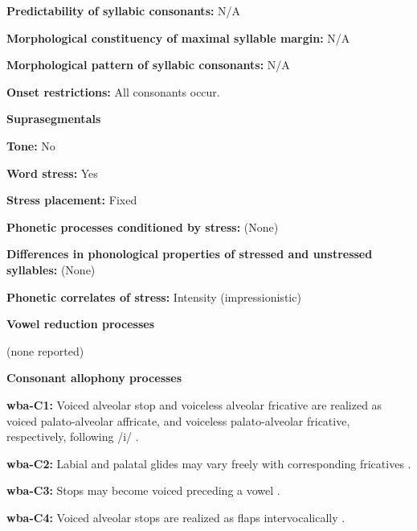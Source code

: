 \textbf{Predictability of syllabic consonants:} N/A



\textbf{Morphological constituency of maximal syllable margin:} N/A



\textbf{Morphological pattern of syllabic consonants:} N/A



\textbf{Onset restrictions:} All consonants occur.



\textbf{Suprasegmentals}



\textbf{Tone:} No



\textbf{Word stress:} Yes



\textbf{Stress placement:} Fixed



\textbf{Phonetic processes conditioned by stress:} (None)



\textbf{Differences in phonological properties of stressed and unstressed syllables:} (None)



\textbf{Phonetic correlates of stress:} Intensity (impressionistic)



\textbf{Vowel reduction processes}



(none reported)



\textbf{Consonant allophony processes}



\textbf{wba-C1:} Voiced alveolar stop and voiceless alveolar fricative are realized as voiced palato-alveolar affricate, and voiceless palato-alveolar fricative, respectively, following /i/ \citep[121]{Arinterol2000}.



\textbf{wba-C2:} Labial and palatal glides may vary freely with corresponding fricatives \citep[122]{Arinterol2000}.



\textbf{wba-C3:} Stops may become voiced preceding a vowel \citep[107]{Arinterol1997}.



\textbf{wba-C4:} Voiced alveolar stops are realized as flaps intervocalically \citep[107]{Arinterol1997}.



